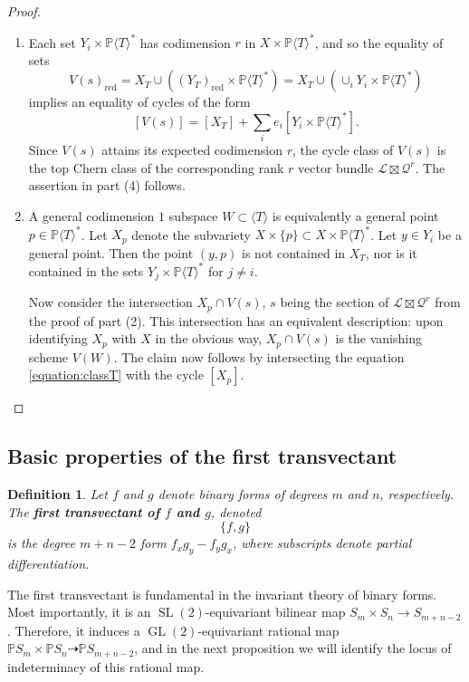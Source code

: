 \documentclass[reqno, 11pt]{amsart}
\theoremstyle{plain}
\newtheorem{definition}[theorem]{Definition}
\theoremstyle{remark}
\renewcommand{\P}{\mathbb{P}}
\renewcommand{\L}{\mathscr{L}}
\DeclareMathOperator{\GL}{GL}
\DeclareMathOperator{\SL}{SL}
\DeclareMathOperator{\red}{red}
\begin{document}
\begin{proof}
\begin{enumerate}
        \item Each set $Y_{i} \times \P \langle T \rangle^{*}$ has codimension $r$ in $X \times \P \langle T \rangle^{*}$, and so the equality of sets \[V(s)_{\red} = X_{T} \cup \left((Y_{T})_{\red} \times \P \langle T \rangle^{*}\right) = X_{T} \cup (\cup_{i} Y_{i} \times \P \langle T \rangle^{*})\] implies an equality of cycles of the form \[[V(s)] = [X_{T}] + \sum_{i} e_i [Y_i \times \P \langle T \rangle^{*}].\]  Since $V(s)$ attains its expected codimension $r$, the cycle class of $V(s)$ is the top Chern class of the corresponding rank $r$ vector bundle $\L \boxtimes \mathscr{Q}^{r}$.  The assertion in part (4) follows.
        \item A general codimension $1$ subspace $W \subset \langle T \rangle$ is equivalently a general point $p \in \P \langle T \rangle^{*}$. Let $X_{p}$ denote the subvariety $X \times \{p\} \subset X \times \P \langle T \rangle^{*}$.  Let $y \in Y_{i}$ be a general point. Then the point $(y,p)$ is not contained in $X_{T}$, nor is it contained in the sets $Y_{j} \times \P \langle T \rangle^{*}$ for $j \neq i$.  
        
        Now consider the intersection $X_{p} \cap V(s)$, $s$ being the section of $\L \boxtimes \mathscr{Q}^{r}$ from the proof of part (2). This intersection has an equivalent description: upon identifying $X_p$ with $X$ in the obvious way, $X_{p} \cap V(s)$ is the vanishing scheme $V(W)$. The claim now follows by intersecting the equation \eqref{equation:classT} with the cycle $[X_{p}]$.
    \end{enumerate}
    \end{proof}


    \subsection{Basic properties of the first transvectant}
    
    
    \begin{definition}
        \label{definition:transvectant} Let $f$ and $g$ denote binary forms of degrees $m$ and $n$, respectively. The \textbf{first transvectant of $f$ and $g$}, denoted $$\{f,g\}$$ is the degree $m+n-2$ form $f_{x}g_{y} - f_{y}g_{x}$, where subscripts denote partial differentiation.
    \end{definition}

    The first transvectant is fundamental in the invariant theory of binary forms.  Most importantly, it is an $\SL(2)$-equivariant bilinear map $S_{m} \times S_{n} \to S_{m+n-2}$.  Therefore, it induces a $\GL(2)$-equivariant rational map $\P S_m \times \P S_{n} \dashrightarrow \P S_{m+n-2}$, and in the next proposition we will identify the locus of indeterminacy of this rational map.
\end{document}
